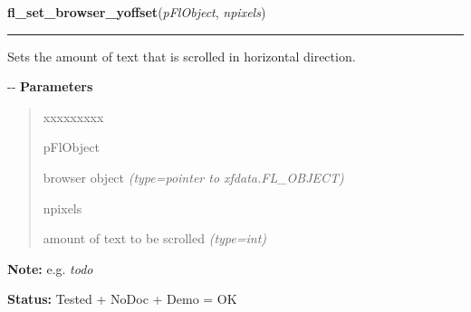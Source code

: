 \hspace{.8\funcindent}\begin{boxedminipage}{\funcwidth}

    \raggedright \textbf{fl\_set\_browser\_yoffset}(\textit{pFlObject}, \textit{npixels})

    \vspace{-1.5ex}

    \rule{\textwidth}{0.5\fboxrule}
\setlength{\parskip}{2ex}

Sets the amount of text that is scrolled in horizontal direction.

-{}-
\setlength{\parskip}{1ex}
      \textbf{Parameters}
      \vspace{-1ex}

      \begin{quote}
        \begin{Ventry}{xxxxxxxxx}

          \item[pFlObject]


browser object
            {\it (type=pointer to xfdata.FL\_OBJECT)}

          \item[npixels]


amount of text to be scrolled
            {\it (type=int)}

        \end{Ventry}

      \end{quote}

\textbf{Note:} 
e.g. \emph{todo}


\textbf{Status:} 
Tested + NoDoc + Demo = OK


    \end{boxedminipage}

    \label{xformslib:flbrowser:fl_set_browser_rel_yoffset}

    \vspace{0.5ex}

